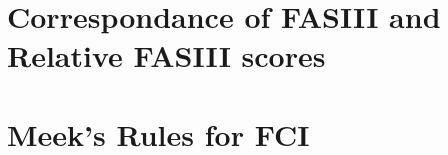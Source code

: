 \documentclass[main.tex]{subfiles}
\begin{document}
\section{Correspondance of FASIII and Relative FASIII scores}
\label{appendix:FASIII_RelFAS}





\section{Meek's Rules for FCI \cite{ZHANG20081873}}
\label{appendix:Meek_FCI}
\end{document}
